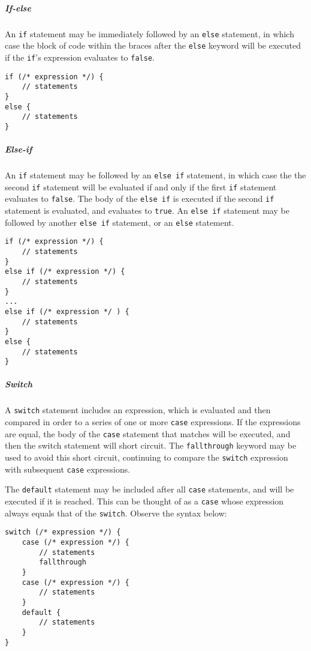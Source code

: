 \subparagraph{If-else}\label{if-else}

An \texttt{if} statement may be immediately followed by an \texttt{else}
statement, in which case the block of code within the braces after the
\texttt{else} keyword will be executed if the \texttt{if}'s expression
evaluates to \texttt{false}.

\begin{verbatim}
if (/* expression */) {
    // statements
}
else {
    // statements
}
\end{verbatim}

\subparagraph{Else-if}\label{else-if}

An \texttt{if} statement may be followed by an \texttt{else if}
statement, in which case the the second \texttt{if} statement will be
evaluated if and only if the first \texttt{if} statement evaluates to
\texttt{false}. The body of the \texttt{else if} is executed if the
second \texttt{if} statement is evaluated, and evaluates to
\texttt{true}. An \texttt{else if} statement may be followed by another
\texttt{else if} statement, or an \texttt{else} statement.

\begin{verbatim}
if (/* expression */) {
    // statements
}
else if (/* expression */) {
    // statements
}
...
else if (/* expression */ ) {
    // statements
}
else {
    // statements
}
\end{verbatim}

\subparagraph{Switch}\label{switch}

A \texttt{switch} statement includes an expression, which is evaluated
and then compared in order to a series of one or more \texttt{case}
expressions. If the expressions are equal, the body of the \texttt{case}
statement that matches will be executed, and then the switch statement
will short circuit. The \texttt{fallthrough} keyword may be used to
avoid this short circuit, continuing to compare the \texttt{switch}
expression with subsequent \texttt{case} expressions.

The \texttt{default} statement may be included after all \texttt{case}
statements, and will be executed if it is reached. This can be thought
of as a \texttt{case} whose expression always equals that of the
\texttt{switch}. Observe the syntax below:

\begin{verbatim}
switch (/* expression */) {
    case (/* expression */) {
        // statements
        fallthrough
    }
    case (/* expression */) {
        // statements
    }
    default {
        // statements
    }
}
\end{verbatim}

